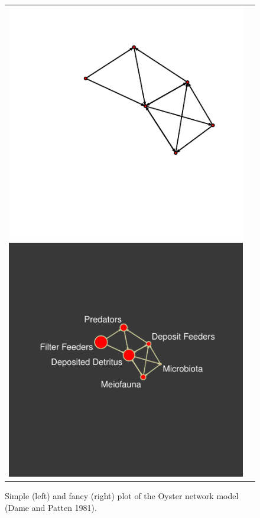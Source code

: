 \documentclass[article]{jss}
\begin{document}
\begin{figure}
  \center
  \begin{tabular}{cc}
\includegraphics{enaR-vignette-019}
\includegraphics{enaR-vignette-020}
  \end{tabular}
  \caption{Simple (left) and fancy (right) plot of the Oyster network
    model (Dame and Patten 1981).} \label{fig:oyster}
\end{figure}
\end{document}
